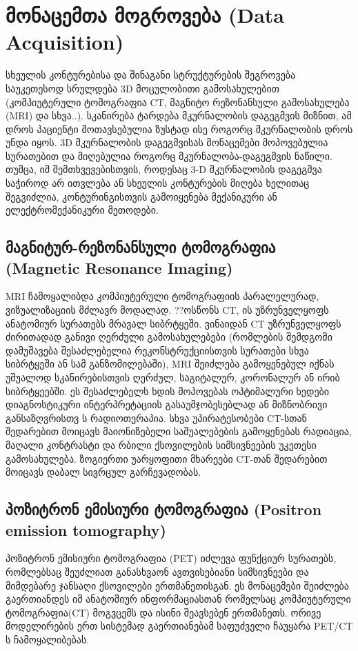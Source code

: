 \documentclass[12pt,a4paper,]{report}
\begin{document}
\chapter{მონაცემთა მოგროვება (Data Acquisition)}
სხეულის კონტურებისა და შინაგანი სტრუქტურების შეგროვება საუკეთესოდ სრულდება 3D მოცულობითი გამოსახულებით (კომპიუტერული ტომოგრაფია CT, მაგნიტო რეზონანსული გამოსახულება (MRI) და სხვა..). სკანირება ტარდება მკურნალობის დაგეგმვის მიზნით, ამ დროს პაციენტი მოთავსებულია ზუსტად ისე როგორც მკურნალობის დროს უნდა იყოს. 3D მკურნალობის დაგეგმვისას მონაცემები მოპოვებულია სურათებით და მიღებულია როგორც მკურნალობა-დაგეგმვის ნაწილი. თუმცა, იმ შემთხვევებისთვის, როდესაც 3-D მკურნალობის დაგეგმვა საჭიროდ არ ითვლება ან სხეულის კონტურების მიღება ხელითაც შეგვიძლია, კონტურინგისთვის გამოიყენება მექანიკური ან ელექტრომექანიკური მეთოდები.

\section{მაგნიტურ-რეზონანსული ტომოგრაფია (Magnetic Resonance Imaging)}
MRI ჩამოყალიბდა კომპიუტერული ტომოგრაფიის პარალელურად, ვიზუალიზაციის მძლავრ მოდალად. ??ოსწონს CT, ის უზრუნველყოფს ანატომიურ სურათებს მრავალ სიბრტყეში. ვინაიდან CT უზრუნველყოფს ძირითადად განივი ღერძული გამოსახულებები (რომლების შემდგომი დამუშავება შესაძლებელია რეკონსტრუქციისთვის სურათები სხვა სიბრტყეში ან სამ განზომილებაში), MRI შეიძლება გამოყენებულ იქნას უშუალოდ სკანირებისთვის ღერძულ, საგიტალურ, კორონალურ ან ირიბ სიბრტყეებში. ეს შესაძლებელს ხდის მოპოვებას ოპტიმალური ხედები დიაგნოსტიკური ინტერპრეტაციის გასაუმჯობესებლად ან მიზნობრივი განსაზღვრისთვ ს რადიოთერაპია. სხვა უპირატესობები CT-სთან შედარებით მოიცავს მაიონიზებელი საშუალებების გამოყენებას რადიაცია, მაღალი კონტრასტი და რბილი ქსოვილების სიმსივნეების უკეთესი გამოსახულება. ზოგიერთი უარყოფითი მხარეები CT-თან შედარებით მოიცავს დაბალ სივრცულ გარჩევადობას.

\section{პოზიტრონ ემისიური ტომოგრაფია (Positron emission tomography)}
პოზიტრონ ემისიური ტომოგრაფია (PET) იძლევა ფუნქციურ სურათებს, რომლებსაც შეუძლიათ განასხვაონ ავთვისებიანი სიმსივნეები და მიმდებარე ჯანსაღი ქსოვილები ერთმანეთისგან. ეს მონაცემები შეიძლება გაერთიანდეს იმ ანატომიურ ინფორმაციასთან რომელსაც კომპიუტერული ტომოგრაფია(CT) მოგვცემს და ისინი შეავსებენ ერთმანეთს. ორივე მოდელირების ერთ სისტემად გაერთიანებამ საფუძველი ჩაუყარა PET/CT ს ჩამოყალიბებას.
\end{document}
